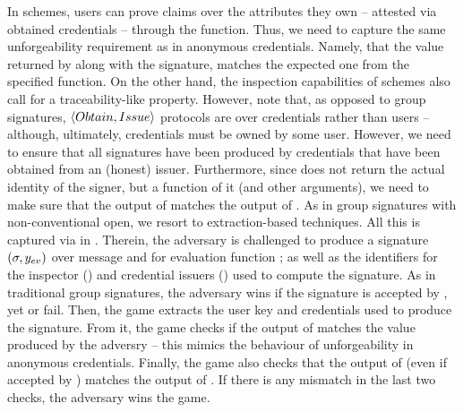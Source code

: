 In \UAS schemes, users can prove claims over the attributes they own
-- attested via obtained credentials -- through the \feval function. Thus, we
need to capture the same unforgeability requirement as in anonymous credentials.
Namely, that the \yeval value returned by \Sign along with the signature,
matches the expected one from the specified \feval function.
On the other hand, the inspection capabilities of \UAS schemes also call for a
traceability-like property. However, note that, as opposed to group signatures,
$\langle Obtain,Issue \rangle$ protocols are over credentials rather than
users -- although, ultimately, credentials must be owned by some user.
However, we need to ensure that all signatures have been produced by credentials
that have been obtained from an (honest) issuer. Furthermore, since \Inspect
does not return the actual identity of the signer, but a function \finsp of it
(and other arguments), we need to make sure that the output of \Inspect
matches the output of \finsp. As in group signatures with non-conventional open,
we resort to extraction-based techniques. All this is captured via \ExpForgeSign
in . Therein, the adversary is challenged to
produce a signature $(\sigma,y_{ev})$ over message \msg and for evaluation
function \feval; as well as the identifiers for the inspector (\oid) and
credential issuers (\siid) used to compute the signature. As in traditional
group signatures, the adversary wins if the signature is accepted by \Verify,
yet \Inspect or \Judge fail. Then, the game extracts the user key and
credentials used to produce the signature. From it, the game checks if the
output of \feval matches the \yeval value produced by the adversry -- this
mimics the behaviour of unforgeability in anonymous credentials. Finally, the
game also checks that the output of \Inspect (even if accepted by \Judge)
matches the output of \finsp. If there is any mismatch in the last two checks,
the adversary wins the game.

